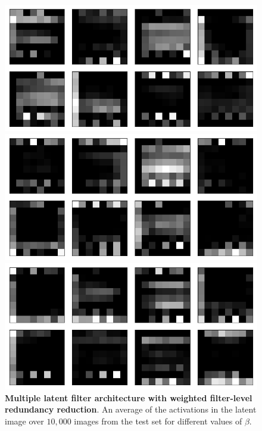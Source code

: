\begin{figure}[h!]
\centering
\captionsetup{justification=centering}

    \includegraphics[scale=0.42]{figures/results/weighted_average/beta_1_average_activation.png}
    \caption{$\beta=1$}
    \includegraphics[scale=0.42]{figures/results/weighted_average/beta_2_average_activation.png}
    \caption{$\beta=2$}
    \includegraphics[scale=0.42]{figures/results/weighted_average/beta_4_average_activation.png}
    \caption{$\beta=4$}

\caption{\textbf{Multiple latent filter architecture with weighted filter-level redundancy reduction}. An average of the activations in the latent image over $10,000$ images from the test set for different values of $\beta$.}
\label{fig:weighted_average_average_filters}
\end{figure}




